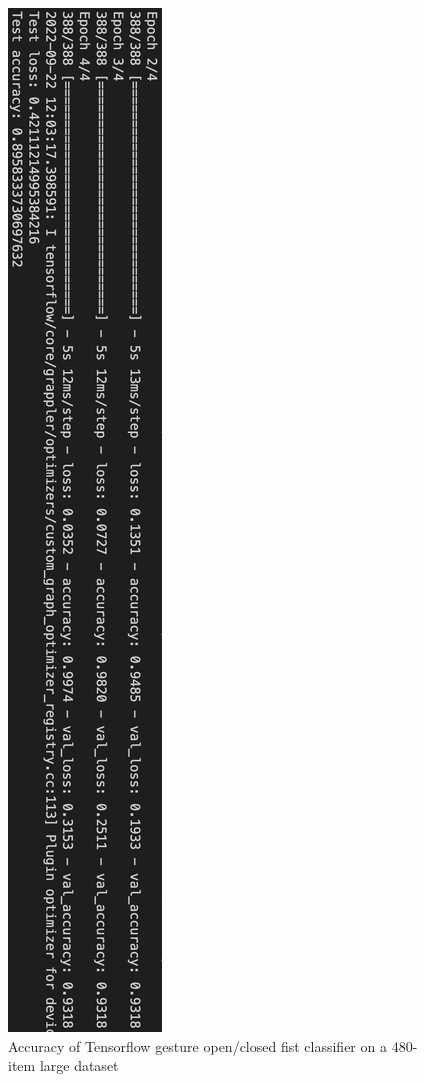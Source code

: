 \begin{figure}[h]
    \centering
    \includegraphics[width=0.7\linewidth]{figures/tf_open_fist_accuracy.png}
    \caption{Accuracy of Tensorflow gesture open/closed fist classifier on a 480-item large dataset }
    \label{fig:tf_open_fist_accuracy}
\end{figure}